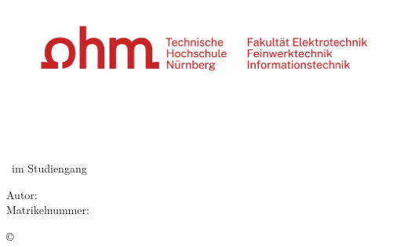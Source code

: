 \thispagestyle{empty}
\begin{titlepage}

\begin{center}

\includegraphics[width=0.9\linewidth]{figures/efi-logo.jpg}\\[2cm]

\huge
\textbf{\titel}\\[1cm]

\vspace*{\fill}

\LARGE
\textbf{\artderarbeit}\\[0.5cm]

\Large
\textbf{\untertitel}\\[1cm]

\Large 
~im Studiengang \studiengang\\[1cm]

\vspace*{\fill}

\Large
Autor: \autor\\[0.5cm]

\Large
Matrikelnummer: \matrikelnr\\[2cm]

\end{center}

\begin{center}
\copyright\,\the\year
\end{center}

\end{titlepage}
